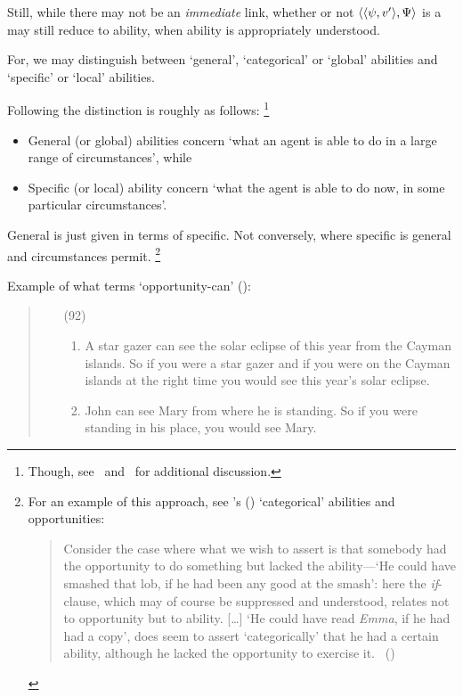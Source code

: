 \begin{note}
  Still, while there may not be an \emph{immediate} link, whether or not \(\langle \langle \psi, v' \rangle, \Psi \rangle\) is a \fc{} may still reduce to ability, when ability is appropriately understood.

  \nocite{Maier:2018uo}
  For, we may distinguish between `general', `categorical' or `global' abilities and `specific' or `local' abilities.

  Following \textcite[2]{Whittle:2010wr} the distinction is roughly as follows:%
  \footnote{
    Though, see~\textcite[esp.\ \S4]{Kittle:2015tb} and~\textcite[1--2]{Kikkert:2022wp} for additional discussion.%
  }
  \begin{itemize}[noitemsep]
  \item
    General (or global) abilities concern `what an agent is able to do in a large range of circumstances', while
  \item
    Specific (or local) ability concern `what the agent is able to do now, in some particular circumstances'.
  \end{itemize}
  General is just given in terms of specific.
  Not conversely, where specific is general and circumstances permit.%
  \footnote{
    For an example of this approach, see \citeauthor{Austin:1961vz}'s (\citeyear{Austin:1961vz}) `categorical' abilities and opportunities:

    \begin{quote}
      Consider the case where what we wish to assert is that somebody had the opportunity to do something but lacked the ability---`He could have smashed that lob, if he had been any good at the smash':
      here the \emph{if}-clause, which may of course be suppressed and understood, relates not to opportunity but to ability.
      [\dots]
      `He could have read \emph{Emma}, if he had had a copy', does seem to assert `categorically' that he had a certain ability, although he lacked the opportunity to exercise it.%
      \mbox{ }\hfill\mbox{(\citeyear[177]{Austin:1961vz})}
    \end{quote}
  }

  Example of what \textcite{Hackl:1998tt} terms `opportunity-can' (\citeyear[14]{Hackl:1998tt}):

  \begin{quote}
    \begin{enumerate}
    \item[(92)]
      \begin{enumerate}[label=\alph*., ref=(\alph*)]
      \item
        \label{Hackl:OC:a}
        A star gazer can see the solar eclipse of this year from the Cayman islands.\newline
        So if you were a star gazer and if you were on the Cayman islands at the right time you would see this year's solar eclipse.
      \item
        \label{Hackl:OC:b}
        John can see Mary from where he is standing.\newline
        So if you were standing in his place, you would see Mary.
      \end{enumerate}
    \end{enumerate}


\end{quote}
\end{note}
